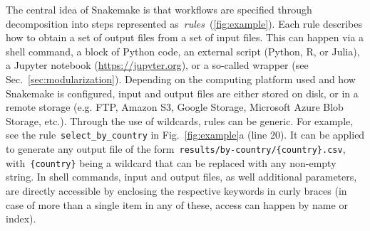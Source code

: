 \documentclass[parskip=half, DIV=18]{scrartcl}
\let\plainurl\url
\renewcommand{\url}[1]{\protect\plainurl{#1}}
\begin{document}
The central idea of Snakemake is that workflows are specified through decomposition into steps represented as~\emph{rules~}(\autoref{fig:example}).
Each rule describes how to obtain a set of output files from a set of input files.
This can happen via a shell command, a block of Python code, an external script (Python, R, or Julia), a Jupyter notebook (\url{https://jupyter.org}), or a so-called wrapper (see Sec.~\ref{sec:modularization}).
Depending on the computing platform used and how Snakemake is configured, input and output files are either stored on disk, or in a remote storage (e.g. FTP, Amazon S3, Google Storage, Microsoft Azure Blob Storage, etc.).
Through the use of wildcards, rules can be generic.
For example, see the rule~\lstinline!select_by_country! in Fig.~\ref{fig:example}a (line 20).
It can be applied to generate any output file of the form~\lstinline!results/by-country/{country}.csv!, with~\lstinline!{country}! being a wildcard that can be replaced with any non-empty string.
In shell commands, input and output files, as well additional parameters, are directly accessible by enclosing the respective keywords in curly braces (in case of more than a single item in any of these, access can happen by name or index).
\end{document}
